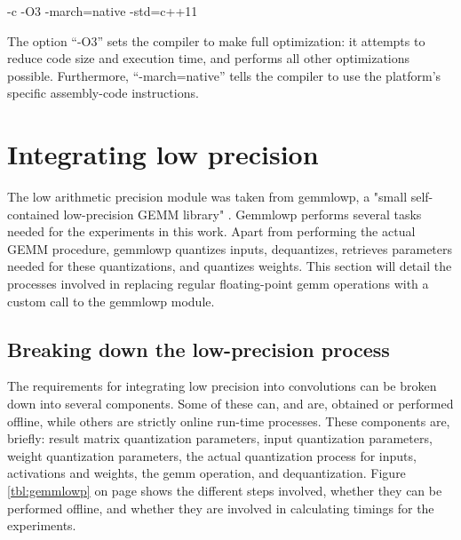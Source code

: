 \lstset{language=make}
-c -O3 -march=native -std=c++11

The option ``-O3'' sets the compiler to make full optimization: it attempts to reduce code size and execution time, and performs all other optimizations possible. Furthermore, ``-march=native'' tells the compiler to use the platform's specific assembly-code instructions.

\section{Integrating low precision}
The low arithmetic precision module was taken from gemmlowp, a "small self-contained low-precision GEMM library" \cite{gemmlowp}. Gemmlowp performs several tasks needed for the experiments in this work. Apart from performing the actual GEMM procedure, gemmlowp quantizes inputs, dequantizes, retrieves parameters needed for these quantizations, and quantizes weights. This section will detail the processes involved in replacing regular floating-point gemm operations with a custom call to the gemmlowp module.

\subsection{Breaking down the low-precision process}
The requirements for integrating low precision into convolutions can be broken down into several components. Some of these can, and are, obtained or performed offline, while others are strictly online run-time processes. These components are, briefly: result matrix quantization parameters, input quantization parameters, weight quantization parameters, the actual quantization process for inputs, activations and weights, the gemm operation, and dequantization. Figure \ref{tbl:gemmlowp} on page \pageref{tbl:gemmlowp} shows the different steps involved, whether they can be performed offline, and whether they are involved in calculating timings for the experiments.

